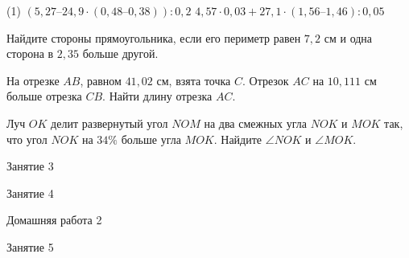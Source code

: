 \begin{homework}[number=1]
	\begin{listofex}
		\item \begin{tasks}(1)
			\task \( (5,27 – 24,9 \cdot (0,48 – 0,38)) : 0,2 \)
			\task \( 4,57\cdot 0,03 + 27,1 \cdot (1,56 – 1,46) : 0,05 \)
		\end{tasks}
		\item Найдите стороны прямоугольника, если его периметр равен \( 7,2 \) см и одна сторона в \( 2,35 \) больше другой.
		\item На отрезке \( AB \), равном \( 41,02  \) см, взята точка \( C \).
		Отрезок \( AC \) на \( 10,111 \) см больше отрезка \( CB \). Найти длину отрезка \( AC \).
		\item Луч \( OK \) делит развернутый угол \( NOM \) на два смежных угла \( NOK \) и \( MOK \) так, что угол \( NOK \) на \( 34\% \) больше угла \( MOK \). Найдите \( \angle NOK \) и \( \angle MOK \).
	\end{listofex}
\end{homework}

\begin{class}[number=3]
	\begin{listofex}
		\item Занятие 3 
	\end{listofex}
\end{class}

\begin{class}[number=4]
	\begin{listofex}
		\item Занятие 4
	\end{listofex}
\end{class}

\begin{homework}[number=2]
	\begin{listofex}
		\item Домашняя работа 2
	\end{listofex}
\end{homework}

\begin{class}[number=5]
	\begin{listofex}
		\item Занятие 5
	\end{listofex}
\end{class}

